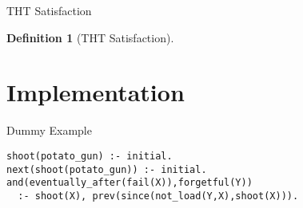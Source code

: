 \documentclass[aspectratio=169,xcolor=svgnames]{beamer}
\theoremstyle{theoremstyle_space}
\newtheorem{definition}{Definition}
\begin{document}
\begin{frame}[t]{THT Satisfaction}
\begin{definition}[THT Satisfaction]
\begin{enumerate}
\end{enumerate}
\end{definition}

\end{frame}


\section{Implementation}

\begin{frame}[t,fragile]{Dummy Example} 

\begin{lstlisting}[language=clingo,numbers=none]
shoot(potato_gun) :- initial.
next(shoot(potato_gun)) :- initial.
and(eventually_after(fail(X)),forgetful(Y)) 
  :- shoot(X), prev(since(not_load(Y,X),shoot(X))).
\end{lstlisting}

\end{frame}
\end{document}

